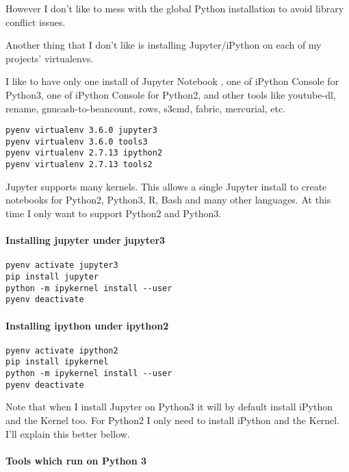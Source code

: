 \documentclass[11pt]{article}
\begin{document}
However I don't like to mess with the global Python installation to avoid library conflict issues.

Another thing that I don't like is installing Jupyter/iPython on each of my projects' virtualenvs.

I like to have only one install of Jupyter Notebook , one of iPython Console for Python3, one of iPython Console for Python2, and other tools like youtube-dl, rename, gnucash-to-beancount, rows, s3cmd, fabric, mercurial, etc.

\begin{verbatim}
pyenv virtualenv 3.6.0 jupyter3
pyenv virtualenv 3.6.0 tools3
pyenv virtualenv 2.7.13 ipython2
pyenv virtualenv 2.7.13 tools2
\end{verbatim}

Jupyter supports many kernels. This allows a single Jupyter install to create notebooks for Python2, Python3, R, Bash and many other languages. At this time I only want to support Python2 and Python3.

\paragraph{Installing jupyter under jupyter3}
\label{sec:org26e5409}

\begin{verbatim}
pyenv activate jupyter3
pip install jupyter
python -m ipykernel install --user
pyenv deactivate
\end{verbatim}

\paragraph{Installing ipython under ipython2}
\label{sec:orgbebe4ab}

\begin{verbatim}
pyenv activate ipython2
pip install ipykernel
python -m ipykernel install --user
pyenv deactivate
\end{verbatim}

Note that when I install Jupyter on Python3 it will by default install iPython and the Kernel too. For Python2 I only need to install iPython and the Kernel. I'll explain this better bellow.

\paragraph{Tools which run on Python 3}
\label{sec:orgba0b0ed}
\end{document}
